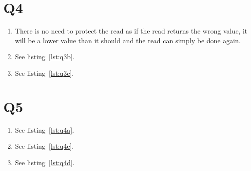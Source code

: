 \documentclass[a4paper]{article}
\begin{document}
\section*{Q4} %
\begin{enumerate}
\item %
There is no need to protect the read as if the read returns the wrong value, it will be a lower value than it should and the read can simply be done again.
\item %
See listing~\ref{lst:q3b}.

\item %
See listing~\ref{lst:q3c}.
\end{enumerate}




\section*{Q5} %
\begin{enumerate}
\item %
See listing~\ref{lst:q4a}.
\setcounter{enumi}{3}
\item %
See listing~\ref{lst:q4e}.
\item %
See listing~\ref{lst:q4d}.
\end{enumerate}







\end{document}
